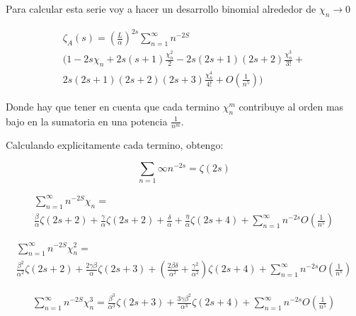 Para calcular esta serie voy a hacer un desarrollo binomial alrededor de $\chi _n \rightarrow{0} $ 

\begin{equation}
\begin{array}{c}
\zeta _{A} (s) = 
( \frac{L}{\alpha} ) ^{2s}
\sum _{n=1} ^{\infty}
  n  ^{-2 S} \\
(
1 - 2 s \chi _n + 2 s(s+1) \frac{\chi _n ^2}{2} - 2s(2s+1)(2s+2) \frac{ \chi _n ^3}{3!}  + \\ 
2s(2s+1)(2s+2)(2s+3) \frac{\chi ^4 _n}{4!}
+ O( \frac{1}{n ^5}) )

\end{array}
\end{equation}

Donde hay que tener en cuenta que cada termino $\chi _{n} ^{m} $ contribuye al orden mas bajo en la sumatoria en una potencia $\frac{1}{n ^m}$.


Calculando explicitamente cada termino, obtengo:

\begin{equation}
\sum _{n=1} \infty n ^{-2 s} = \zeta (2s)
\end{equation}


\begin{equation}
\begin{array}{c}
\sum _{n=1} ^{\infty}
 n  ^{-2 S}  \chi _n =  \\
\frac{\beta}{\alpha} \zeta (2s+2) + \frac{\gamma}{\alpha} \zeta(2s+2) + \frac{\delta}{\alpha} +
\frac{\eta}{\alpha} \zeta (2s+4) + \sum _{n=1} ^{\infty} n ^{-2s} O(\frac{1}{n ^5})
\end{array}
\end{equation}

\begin{equation}
\begin{array}{c}
    \sum _{n=1} ^{\infty}
    n   ^{-2 S} \chi _n ^2 = \\ 
    \frac{\beta ^2}{\alpha ^2} \zeta(2s+2) +
    \frac{2 \gamma \beta }{\alpha} \zeta (2s+3) + 
    \left( \frac{2 \beta \delta}{\alpha ^2} + \frac{\gamma ^2}{\alpha ^2} \right) \zeta (2s+4) + 
    \sum _{n=1} ^{\infty} n ^{-2s} O( \frac{1}{n^s} )
\end{array}
\end{equation}

\begin{equation}
\begin{array}{cc}
    \sum _{n=1} ^{\infty} 
    n ^{-2 S} \chi _n ^3 =
    \frac{\beta ^3}{\alpha ^3} \zeta (2s+3) + 
    \frac{3 \gamma \beta ^2}{\alpha ^3} \zeta (2s+4)
    + \sum _{n=1} ^{\infty} n ^{-2s} O( \frac{1}{n ^5} )
    
\end{array}
\end{equation}

